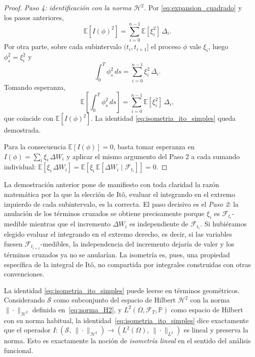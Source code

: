 \documentclass[11pt,a4paper,oneside]{report}
\theoremstyle{plain}
\theoremstyle{definition}
\theoremstyle{remark}
\newcommand{\E}{\mathbb{E}}
\newcommand{\PP}{\mathbb{P}}
\newcommand{\F}{\mathcal{F}}
\newcommand{\1}{\mathbf{1}}
\begin{document}
\begin{proof}
\emph{Paso 4: identificación con la norma $\mathcal{H}^2$.} Por
\eqref{eq:expansion_cuadrado} y los pasos anteriores,
\begin{equation*}
  \E[I(\phi)^2] = \sum_{i=0}^{n-1} \E[\xi_i^2]\, \Delta_i.
\end{equation*}
Por otra parte, sobre cada subintervalo $(t_i, t_{i+1}]$ el proceso
$\phi$ vale $\xi_i$, luego $\phi_s^2 = \xi_i^2$ y
\begin{equation*}
  \int_0^T \phi_s^2\, ds = \sum_{i=0}^{n-1} \xi_i^2\, \Delta_i.
\end{equation*}
Tomando esperanza,
\begin{equation*}
  \E\!\left[\int_0^T \phi_s^2\, ds\right]
  = \sum_{i=0}^{n-1} \E[\xi_i^2]\, \Delta_i,
\end{equation*}
que coincide con $\E[I(\phi)^2]$. La identidad
\eqref{eq:isometria_ito_simples} queda demostrada.

Para la consecuencia $\E[I(\phi)] = 0$, basta tomar esperanza en
$I(\phi) = \sum_i \xi_i\, \Delta W_i$ y aplicar el mismo argumento del
Paso 2 a cada sumando individual: $\E[\xi_i\, \Delta W_i] = \E[\xi_i\,
\E[\Delta W_i \mid \F_{t_i}]] = 0$.
\end{proof}

La demostración anterior pone de manifiesto con toda claridad la razón matemática por la que la elección de Itô, evaluar el integrando en el extremo izquierdo de cada subintervalo, es la correcta. El paso decisivo es el \emph{Paso 2}: la anulación de los
términos cruzados se obtiene precisamente porque $\xi_i$ es
$\F_{t_i}$-medible mientras que el incremento $\Delta W_i$ es
independiente de $\F_{t_i}$. Si hubiéramos elegido evaluar el
integrando en el extremo derecho, es decir, si las variables fuesen
$\F_{t_{i+1}}$-medibles, la independencia del incremento dejaría de
valer y los términos cruzados ya no se anularían. La isometría es,
pues, una propiedad específica de la integral de Itô, no compartida
por integrales construidas con otras convenciones.

La identidad
\eqref{eq:isometria_ito_simples} puede leerse en términos geométricos. Considerando $\mathcal{S}$ como subconjunto del
espacio de Hilbert $\mathcal{H}^2$ con la norma $\|\cdot\|_{\mathcal{H}^2}$
definida en~\eqref{eq:norma_H2}, y $L^2(\Omega, \F_T, \PP)$ como
espacio de Hilbert con su norma habitual, la
identidad~\eqref{eq:isometria_ito_simples} dice exactamente que el
operador $I : (\mathcal{S},\, \|\cdot\|_{\mathcal{H}^2}) \to
(L^2(\Omega),\, \|\cdot\|_{L^2})$ es lineal y preserva la norma. Esto
es exactamente la noción de \emph{isometría lineal} en el sentido del
análisis funcional.
\end{document}
